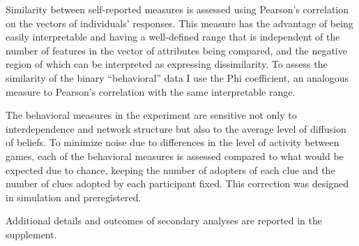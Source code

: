 \documentclass[9pt,twocolumn,twoside,lineno]{pnas-new}
\begin{document}
{Similarity between self-reported measures is assessed using Pearson’s correlation on the vectors of individuals’ responses. This measure has the advantage of being easily interpretable and having a well-defined range that is independent of the number of features in the vector of attributes being compared, and the negative region of which can be interpreted as expressing dissimilarity. To assess the similarity of the binary “behavioral” data I use the Phi coefficient, an analogous measure to Pearson’s correlation with the same interpretable range.

The behavioral measures in the experiment are sensitive not only to interdependence and network structure but also to the average level of diffusion of beliefs. To minimize noise due to differences in the level of activity between games, each of the behavioral measures is assessed compared to what would be expected due to chance, keeping the number of adopters of each clue and the number of clues adopted by each participant fixed. This correction was designed in simulation and preregistered.

Additional details and outcomes of secondary analyses are reported in the supplement.
}

\showmatmethods{} %



\end{document}
